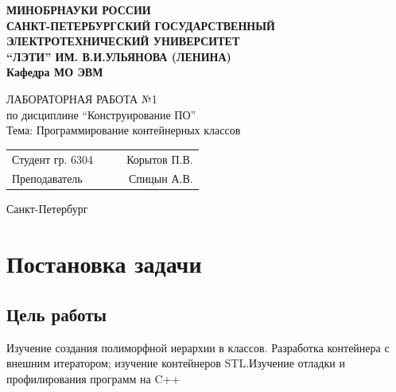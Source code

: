 \documentclass[a4paper, 14pt]{extarticle}
\begin{document}
    
\begin{titlepage}
    \centering
    {\bfseries
        \uppercase{%
            Минобрнауки России \\
            Санкт-Петербургский государственный \\
            Электротехнический университет \\
            \enquote{ЛЭТИ} им. В.И.Ульянова (Ленина)\\
        }
        Кафедра МО ЭВМ

        \vspace{\fill}
        \uppercase{Лабораторная работа №1} \\
        по дисциплине \enquote{Конструирование ПО} \\
        Тема: Программирование контейнерных классов
    }

    \vspace{\fill}
    \begin{tabularx}{0.8\textwidth}{l X c r}
        Студент гр. 6304 & & \underline{\hspace{3cm}} & Корытов П.В.\\
        Преподаватель & & \underline{\hspace{3cm}} & Спицын А.В.
    \end{tabularx}

    \vspace{1cm}
    Санкт-Петербург \\
    \the\year{}
\end{titlepage}
\newpage
\tableofcontents{}

\newpage

\section{Постановка задачи}
\subsection{Цель работы}
Изучение создания полиморфной иерархии в классов. Разработка контейнера с внешним итератором; изучение контейнеров STL.\@ Изучение отладки и профилирования программ на C++
\end{document}
